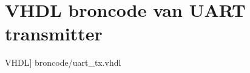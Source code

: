 \section[UART transmitter]{VHDL broncode van UART transmitter}\label{appdix:tx} 
	\scriptsize
	 VHDL] {broncode/uart_tx.vhdl}
	\normalsize


